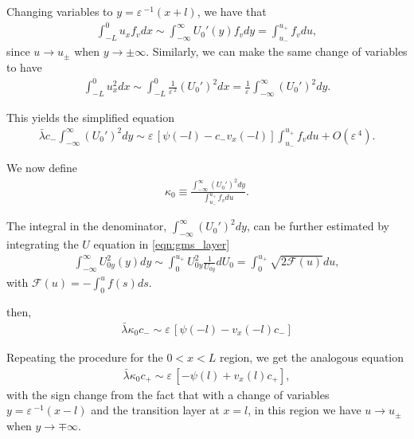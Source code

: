 \documentclass[a4paper,10pt]{article}
\newcommand{\lA}{\ensuremath{\lambda}}
\newcommand{\kA}{\ensuremath{\kappa}}
\newcommand{\Ep}{\ensuremath{\varepsilon\,}}
\newcommand{\FF}{\ensuremath{\mathcal{F}}}
\begin{document}
Changing variables to $y = \Ep^{-1}(x+l)$, we have that
% 
\begin{equation*}
\begin{split}
	\int_{-L}^0u_xf_vdx\sim \int_{-\infty}^{\infty}U_0'(y)f_vdy = \int_{u_-}^{u_+}f_vdu,
\end{split}
\end{equation*}
% 
since $u\rightarrow u_{\pm}$ when $y\rightarrow\pm\infty$. Similarly, we can make the same change of variables to have
% 
\begin{equation*}
\begin{split}
	\int_{-L}^0u_x^2dx\sim \int_{-L}^{0}\frac{1}{\Ep^2}(U_0')^2dx = \frac{1}{\Ep}\int_{-\infty}^{\infty}(U_0')^2dy.
\end{split}
\end{equation*}
% 

This yields the simplified equation
% 
\begin{equation*}
\begin{split}
	\bar{\lA}c_-\int_{-\infty}^{\infty}(U_0')^2 dy \sim \Ep\left[\psi(-l) - c_-v_x(-l)\right]\int_{u_-}^{u_+}f_vdu + O(\Ep^4).
\end{split}
\end{equation*}
% 

We now define 
% 
\begin{equation*}
\begin{split}
	\kA_0 \equiv \frac{\int_{-\infty}^{\infty}(U_0')^2 dy}{\int_{u_-}^{u_+}f_vdu}.
\end{split}
\end{equation*}
% 

The integral in the denominator, $\int_{-\infty}^{\infty}(U_0')^2dy$, can be further estimated by integrating the $U$ equation in \eqref{eqn:gms_layer}
% 
\begin{equation*}
\label{eqn:beta}
\begin{split}
  \int_{-\infty}^{\infty}U_{0y}^2(y)dy \sim \int_{0}^{u_+}U_{0y}^2\frac{1}{U_{0y}}dU_0 = \int_0^{u_+}\sqrt{2\FF(u)}du,
\end{split}
\end{equation*}
% 
with $\FF(u)=-\int_0^uf(s)ds$.


then, 
% 
\begin{equation*}
\begin{split}
	\bar{\lA}\kA_0c_-\sim\Ep\left[\psi(-l) - v_x(-l)c_-\right]
\end{split}
\end{equation*}
% 

Repeating the procedure for the $0<x<L$ region, we get the analogous equation
% 
\begin{equation*}
\begin{split}
	\bar{\lA}\kA_0c_+\sim\Ep\left[-\psi(l) + v_x(l)c_+\right],
\end{split}
\end{equation*}
% 
with the sign change from the fact that with a change of variables $y=\Ep^{-1}(x-l)$ and the transition layer at $x=l$, in this region we have $u\rightarrow u_{\pm}$ when $y\rightarrow\mp\infty$.
\end{document}
